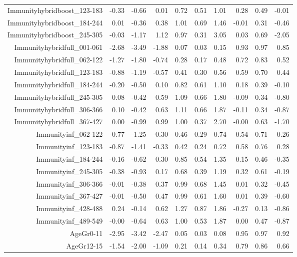 \begin{table}[ht]
\begin{tabular}{rrrrrrrrrr}
  Immunityhybridboost\_123-183 & -0.33 & -0.66 & 0.01 & 0.72 & 0.51 & 1.01 & 0.28 & 0.49 & -0.01 \\ 
  Immunityhybridboost\_184-244 & 0.01 & -0.36 & 0.38 & 1.01 & 0.69 & 1.46 & -0.01 & 0.31 & -0.46 \\ 
  Immunityhybridboost\_245-305 & -0.03 & -1.17 & 1.12 & 0.97 & 0.31 & 3.05 & 0.03 & 0.69 & -2.05 \\ 
  Immunityhybridfull\_001-061 & -2.68 & -3.49 & -1.88 & 0.07 & 0.03 & 0.15 & 0.93 & 0.97 & 0.85 \\ 
  Immunityhybridfull\_062-122 & -1.27 & -1.80 & -0.74 & 0.28 & 0.17 & 0.48 & 0.72 & 0.83 & 0.52 \\ 
  Immunityhybridfull\_123-183 & -0.88 & -1.19 & -0.57 & 0.41 & 0.30 & 0.56 & 0.59 & 0.70 & 0.44 \\ 
  Immunityhybridfull\_184-244 & -0.20 & -0.50 & 0.10 & 0.82 & 0.61 & 1.10 & 0.18 & 0.39 & -0.10 \\ 
  Immunityhybridfull\_245-305 & 0.08 & -0.42 & 0.59 & 1.09 & 0.66 & 1.80 & -0.09 & 0.34 & -0.80 \\ 
  Immunityhybridfull\_306-366 & 0.10 & -0.42 & 0.63 & 1.11 & 0.66 & 1.87 & -0.11 & 0.34 & -0.87 \\ 
  Immunityhybridfull\_367-427 & 0.00 & -0.99 & 0.99 & 1.00 & 0.37 & 2.70 & -0.00 & 0.63 & -1.70 \\ 
  Immunityinf\_062-122 & -0.77 & -1.25 & -0.30 & 0.46 & 0.29 & 0.74 & 0.54 & 0.71 & 0.26 \\ 
  Immunityinf\_123-183 & -0.87 & -1.41 & -0.33 & 0.42 & 0.24 & 0.72 & 0.58 & 0.76 & 0.28 \\ 
  Immunityinf\_184-244 & -0.16 & -0.62 & 0.30 & 0.85 & 0.54 & 1.35 & 0.15 & 0.46 & -0.35 \\ 
  Immunityinf\_245-305 & -0.38 & -0.93 & 0.17 & 0.68 & 0.39 & 1.19 & 0.32 & 0.61 & -0.19 \\ 
  Immunityinf\_306-366 & -0.01 & -0.38 & 0.37 & 0.99 & 0.68 & 1.45 & 0.01 & 0.32 & -0.45 \\ 
  Immunityinf\_367-427 & -0.01 & -0.50 & 0.47 & 0.99 & 0.61 & 1.60 & 0.01 & 0.39 & -0.60 \\ 
  Immunityinf\_428-488 & 0.24 & -0.14 & 0.62 & 1.27 & 0.87 & 1.86 & -0.27 & 0.13 & -0.86 \\ 
  Immunityinf\_489-549 & -0.00 & -0.64 & 0.63 & 1.00 & 0.53 & 1.87 & 0.00 & 0.47 & -0.87 \\ 
  AgeGr0-11 & -2.95 & -3.42 & -2.47 & 0.05 & 0.03 & 0.08 & 0.95 & 0.97 & 0.92 \\ 
  AgeGr12-15 & -1.54 & -2.00 & -1.09 & 0.21 & 0.14 & 0.34 & 0.79 & 0.86 & 0.66 \\ 

\end{tabular}
\end{table}
